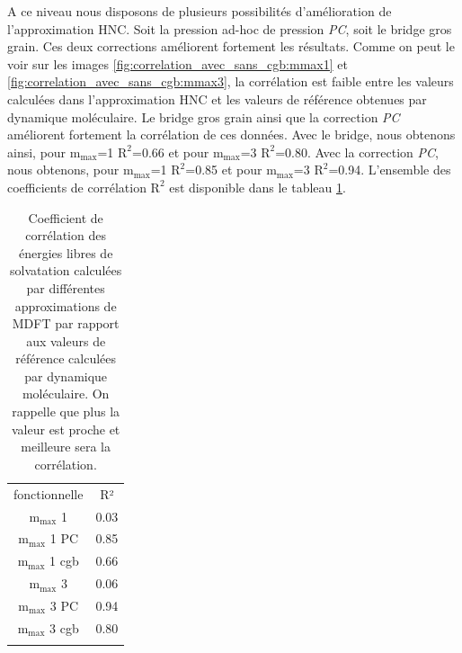 A ce niveau nous disposons de plusieurs possibilités d'amélioration de l'approximation HNC. Soit la pression ad-hoc de pression \textit{PC}, soit le bridge gros grain. Ces deux corrections améliorent fortement les résultats. Comme on peut le voir sur les images \ref{fig:correlation_avec_sans_cgb:mmax1} et \ref{fig:correlation_avec_sans_cgb:mmax3}, la corrélation est faible entre les valeurs calculées dans l'approximation HNC et les valeurs de référence obtenues par dynamique moléculaire. 
Le bridge gros grain ainsi que la correction \textit{PC} améliorent fortement la corrélation de ces données. Avec le bridge, nous obtenons ainsi, pour $\mathrm{m}_\mathrm{max}$=1 $\mathrm{R}^2$=0.66 et pour $\mathrm{m}_\mathrm{max}$=3 $\mathrm{R}^2$=0.80. Avec la correction \textit{PC}, nous obtenons, pour $\mathrm{m}_\mathrm{max}$=1 $\mathrm{R}^2$=0.85 et pour $\mathrm{m}_\mathrm{max}$=3 $\mathrm{R}^2$=0.94. L'ensemble des coefficients de corrélation $\mathrm{R}^2$ est disponible dans le tableau \ref{tab:correlation}.



\begin{table}[H]
  \begin{center}
    \begin{tabular}{ c c }
      \hline & \\[-1em]\hline
       fonctionnelle  & R²  \\
      \hline
       $\mathrm{m}_\mathrm{max}$ 1      & 0.03  \\
       $\mathrm{m}_\mathrm{max}$ 1 PC   & 0.85  \\
       $\mathrm{m}_\mathrm{max}$ 1 cgb  & 0.66  \\
       $\mathrm{m}_\mathrm{max}$ 3      & 0.06  \\
       $\mathrm{m}_\mathrm{max}$ 3 PC   & 0.94  \\
       $\mathrm{m}_\mathrm{max}$ 3 cgb  & 0.80  \\
      \hline & \\[-1em]\hline%
    \end{tabular}
  \end{center}
  \caption[Coefficient de corrélation des énergies libres de solvatation calculées par MDFT par rapport aux valeurs calculées par DM.]{Coefficient de corrélation des énergies libres de solvatation calculées par différentes approximations de MDFT par rapport aux valeurs de référence calculées par dynamique moléculaire. On rappelle que plus la valeur est proche et meilleure sera la corrélation.}
  \label{tab:correlation}  
\end{table}



